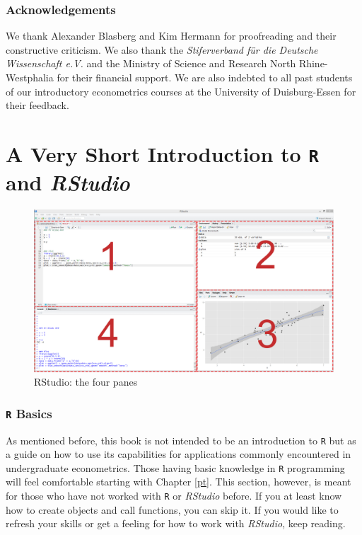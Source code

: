 \documentclass[]{book}
\theoremstyle{definition}
\theoremstyle{definition}
\theoremstyle{definition}
\theoremstyle{remark}
\begin{document}
\subsubsection*{Acknowledgements}\label{acknowledgements}

We thank Alexander Blasberg and Kim Hermann for proofreading and their
constructive criticism. We also thank the \emph{Stiferverband für die
Deutsche Wissenschaft e.V.} and the Ministry of Science and Research
North Rhine-Westphalia for their financial support. We are also indebted
to all past students of our introductory econometrics courses at the
University of Duisburg-Essen for their feedback.

\section{\texorpdfstring{A Very Short Introduction to \texttt{R} and
\emph{RStudio}}{A Very Short Introduction to  and RStudio}}\label{a-very-short-introduction-to-and-rstudio}

\begin{figure}[h]

{\centering \includegraphics[width=1\linewidth]{images/rstudio} 

}

\caption{RStudio: the four panes}\label{fig:unnamed-chunk-7}
\end{figure}

\subsubsection*{\texorpdfstring{\texttt{R}
Basics}{ Basics}}\label{basics}

As mentioned before, this book is not intended to be an introduction to
\texttt{R} but as a guide on how to use its capabilities for
applications commonly encountered in undergraduate econometrics. Those
having basic knowledge in \texttt{R} programming will feel comfortable
starting with Chapter \ref{pt}. This section, however, is meant for
those who have not worked with \texttt{R} or \emph{RStudio} before. If
you at least know how to create objects and call functions, you can skip
it. If you would like to refresh your skills or get a feeling for how to
work with \emph{RStudio}, keep reading.
\end{document}
